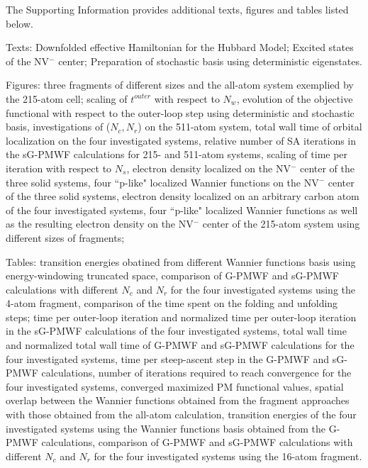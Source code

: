 \documentclass[journal=jacsat,manuscript=article]{achemso}
\begin{document}
\begin{suppinfo}
The Supporting Information provides additional texts, figures and tables listed below.

Texts: Downfolded effective Hamiltonian for the Hubbard Model; Excited states of the NV$^-$ center; Preparation of stochastic basis using deterministic eigenstates.

Figures: three fragments of different sizes and the all-atom system exemplied by the 215-atom cell; scaling of $t^{outer}$ with respect to $N_w$, evolution of the objective functional with respect to the outer-loop step using deterministic and stochastic basis, investigations of ($N_c,N_r$) on the 511-atom system, total wall time of orbital localization on the four investigated systems, relative number of SA iterations in the sG-PMWF calculations for 215- and 511-atom systems, scaling of time per iteration with respect to $N_s$, electron density localized on the NV$^-$ center of the three solid systems, four ``p-like" localized Wannier functions on the NV$^-$ center of the three solid systems, electron density localized on an arbitrary carbon atom of the four investigated systems, four ``p-like" localized Wannier functions as well as the resulting electron density on the NV$^-$ center of the 215-atom system using different sizes of fragments; 

Tables: transition energies obatined from different Wannier functions basis using energy-windowing truncated space, comparison of G-PMWF and sG-PMWF calculations with different $N_c$ and $N_r$ for the four investigated systems using the 4-atom fragment, comparison of the time spent on the folding and unfolding steps; time per outer-loop iteration and normalized time per outer-loop iteration in the sG-PMWF calculations of the four investigated systems, total wall time and normalized total wall time of G-PMWF and sG-PMWF calculations for the four investigated systems, time per steep-ascent step in the G-PMWF and sG-PMWF calculations, number of iterations required to reach convergence for the four investigated systems, converged maximized PM functional values, spatial overlap between the Wannier functions obtained from the fragment approaches with those obtained from the all-atom calculation, transition energies of the four investigated systems using the Wannier functions basis obtained from the G-PMWF calculations, comparison of G-PMWF and sG-PMWF calculations with different $N_c$ and $N_r$ for the four investigated systems using the 16-atom fragment.
\end{suppinfo}


\end{document}
